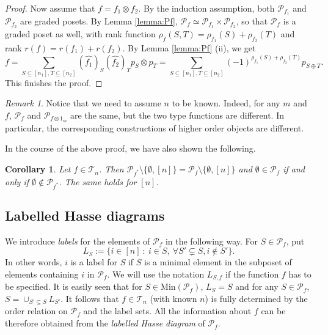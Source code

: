 \documentclass[12pt]{article}
\newtheorem{coro}{Corollary}
\theoremstyle{definition}
\theoremstyle{remark}
\newtheorem{remark}{Remark}
\def\Te{\mathcal T}
\def\Pe{\mathcal P}
\begin{document}
\begin{proof}
Now assume that $f=f_1\otimes f_2$. By the induction assumption, both $\Pe_{f_1}$ and $\Pe_{f_2}$ are graded posets. By Lemma
\ref{lemma:Pf}, $\Pe_f\simeq \Pe_{f_1}\times \Pe_{f_2}$, so that $\Pe_f$  is a graded poset as well, with 
rank function $\rho_f(S,T)=\rho_{f_1}(S)+\rho_{f_2}(T)$ and rank $r(f)=r(f_1)+r(f_2)$.
 By Lemma \ref{lemma:Pf} (ii), we get 
\[
f=\sum_{S\subseteq [n_1], T\subseteq [n_2]} (\widehat {f_1})_S(\widehat
{f_2})_T p_S\otimes p_T=
\sum_{S\subseteq [n_1], T\subseteq [n_2]}(-1)^{\rho_{f_1}(S)+\rho_{f_2}(T)}p_{S\oplus T}.
\]
This finishes the proof.

\end{proof}


\begin{remark}\label{remark:n} Notice that we need to assume $n$ to be known. Indeed, for any $m$ and
$f$, $\Pe_f$ and $\Pe_{f\otimes 1_m}$ are the same, but the  two type functions are
different. In particular, the corresponding constructions of higher order
objects are different.

\end{remark}

In the course of the above proof, we have also shown the following.

\begin{coro}\label{coro:pf_dual} Let $f\in \Te_n$. Then $\Pe_{f^*}\setminus
\{\emptyset,[n]\}=\Pe_{f}\setminus
\{\emptyset,[n]\}$ and $\emptyset \in \Pe_f$ if and only if $\emptyset \notin \Pe_{f^*}$.
The same holds for $[n]$.

\end{coro}

\subsection{Labelled Hasse diagrams}

We  introduce {\em labels} for the elements of $\Pe_f$ in the following way. 
 For  $S\in \Pe_f$, put
\[
L_S:=\{i\in [n]\ : \ i\in S,\ \forall S'\subsetneq S, i\notin S'\}.
\]
In other words, $i$ is a label for $S$ if $S$ is a minimal element in the subposet of
elements containing $i$ in  $\Pe_f$. 
We will use the notation $L_{S,f}$ if the function $f$ has to be
specified. It is easily seen that for $S\in \mathrm{Min}(\Pe_f)$, $L_S=S$ and for any
$S\in \Pe_f$,  $S=\cup_{S'\subseteq S} L_{S'}$.
It follows that $f\in \Te_n$ (with known $n$) is fully determined by the order relation on $\Pe_f$ and the
label sets. All the information about $f$ can be therefore obtained from the {\em labelled
Hasse diagram} of $\Pe_f$. 
\end{document}
